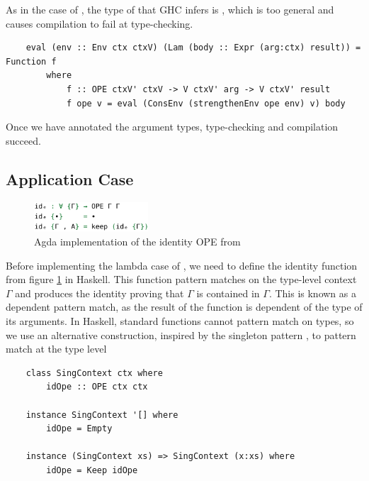 As in the  case of , the type of  that GHC infers is , which is too general and causes compilation to fail at type-checking.

\begin{lstlisting}
    eval (env :: Env ctx ctxV) (Lam (body :: Expr (arg:ctx) result)) = Function f 
        where
            f :: OPE ctxV' ctxV -> V ctxV' arg -> V ctxV' result
            f ope v = eval (ConsEnv (strengthenEnv ope env) v) body
\end{lstlisting}

Once we have annotated the argument types, type-checking and compilation succeed.

\subsection{Application Case}
\label{subsect:typedEvalAppCase}

\begin{figure}[h]
    \centering
    \includegraphics[width=0.38\textwidth]{./images/agda_id_ope.png}
    \caption{Agda implementation of the identity OPE from \cite{AgdaNbe}}
    \label{fig:agdaIdOPE}
\end{figure}

Before implementing the lambda case of , we need to define the identity  function from figure \ref{fig:agdaIdOPE} in Haskell. This function pattern matches on the type-level context $\Gamma$ and produces the identity  proving that $\Gamma$ is contained in $\Gamma$. This is known as a dependent pattern match, as the result of the function is dependent of the type of its arguments. In Haskell, standard functions cannot pattern match on types, so we use an alternative construction, inspired by the singleton pattern \cite{singletons}, to pattern match at the type level



\begin{lstlisting}
    class SingContext ctx where
        idOpe :: OPE ctx ctx

    instance SingContext '[] where
        idOpe = Empty

    instance (SingContext xs) => SingContext (x:xs) where
        idOpe = Keep idOpe
\end{lstlisting}

